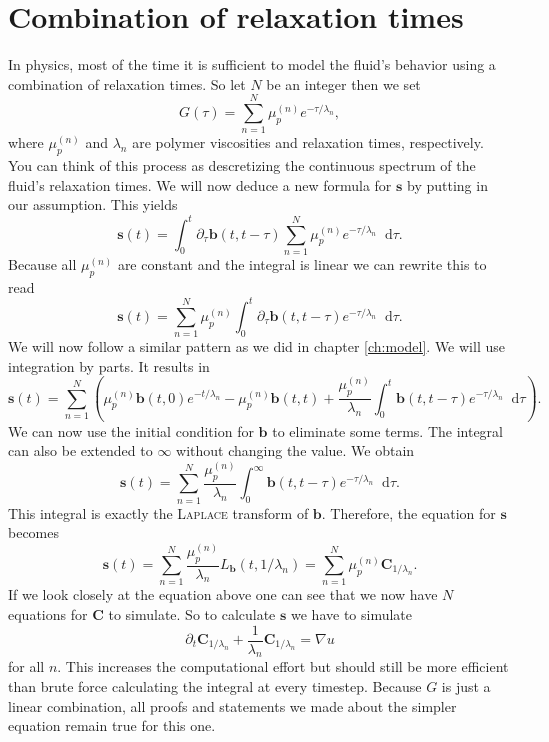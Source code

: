 \documentclass[12pt,a4paper,twoside, open=right]{scrreprt}
\theoremstyle{definition}
\theoremstyle{plain}
\newcommand{\bfb}{\bm{b}}
\newcommand{\bfs}{\bm{s}}
\newcommand{\bfC}{\bm{C}}
\newcommand{\D}{\mathop{}\!\mathrm{d}}
\begin{document}
\section{Combination of relaxation times}
In physics, most of the time it is sufficient to model the fluid's behavior using a combination of relaxation times. So let $N$ be an integer then we set
\begin{equation}
    G(\tau)=\sum_{n=1}^{N}\mu_p^{(n)}e^{-\tau/\lambda_n},
\end{equation}
where $\mu_p^{(n)}$ and $\lambda_n$ are polymer viscosities and relaxation times, respectively. You can think of this process as descretizing the continuous spectrum of the fluid's relaxation times. We will now deduce a new formula for $\bfs$ by putting in our assumption. This yields
\begin{equation}
    \bfs(t)=\int_0^t\partial_\tau \bfb(t,t-\tau)\sum_{n=1}^{N}\mu_p^{(n)}e^{-\tau/\lambda_n}\D\tau.
\end{equation}
Because all $\mu_p^{(n)}$ are constant and the integral is linear we can rewrite this to read
\begin{equation}
    \bfs(t) = \sum_{n=1}^{N}\mu_p^{(n)}\int_0^t\partial_\tau \bfb(t,t-\tau)e^{-\tau/\lambda_n}\D\tau.
\end{equation}
We will now follow a similar pattern as we did in chapter \ref{ch:model}. We will use integration by parts. It results in
\begin{equation}
    \bfs(t)=\sum_{n=1}^{N}\left(\mu_p^{(n)}\bfb(t,0)e^{-t/\lambda_n}-\mu_p^{(n)}\bfb(t,t)+\frac{\mu_p^{(n)}}{\lambda_n}\int_0^t\bfb(t,t-\tau)e^{-\tau/\lambda_n}\D\tau \right).
\end{equation}
We can now use the initial condition for $\bfb$ to eliminate some terms. The integral can also be extended to $\infty$ without changing the value. We obtain
\begin{equation}
    \bfs(t)=\sum_{n=1}^N\frac{\mu_p^{(n)}}{\lambda_n}\int_0^\infty\bfb(t,t-\tau)e^{-\tau/\lambda_n}\D\tau.
\end{equation}
This integral is exactly the \textsc{Laplace} transform of $\bfb$. Therefore, the equation for $\bfs$ becomes
\begin{equation}
    \bfs(t)=\sum_{n=1}^N\frac{\mu_p^{(n)}}{\lambda_n}L_{\bfb}(t,1/\lambda_n)=\sum_{n=1}^N\mu_p^{(n)}\bfC_{1/\lambda_n}.
\end{equation}
If we look closely at the equation above one can see that we now have $N$ equations for $\bfC$ to simulate. So to calculate $\bfs$ we have to simulate 
\begin{equation}
    \partial_t \bfC_{1/\lambda_n}+\frac{1}{\lambda_n}\bfC_{1/\lambda_n}=\nabla u
\end{equation}
for all $n$. This increases the computational effort but should still be more efficient than brute force calculating the integral at every timestep. Because $G$ is just a linear combination, all proofs and statements we made about the simpler equation remain true for this one.
\end{document}
